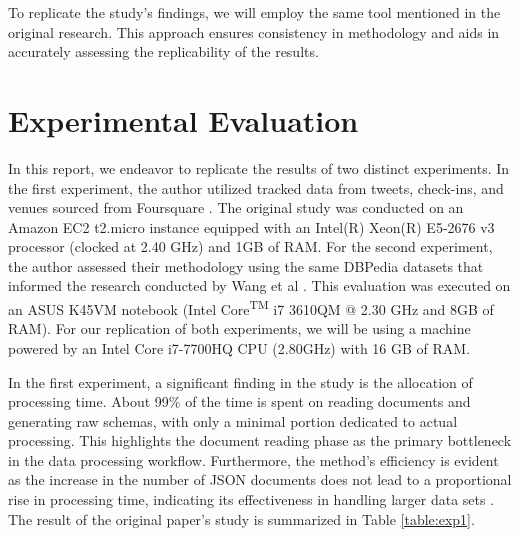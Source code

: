 \documentclass[sigconf, nonacm]{acmart}
\begin{document}
To replicate the study's findings, we will employ the same tool mentioned in the original research. This approach ensures consistency in methodology and aids in accurately assessing the replicability of the results.

\section{Experimental Evaluation} \label{exp-eval}

In this report, we endeavor to replicate the results of two distinct experiments. In the first experiment, the author utilized tracked data from tweets, check-ins, and venues sourced from Foursquare \cite{ccelikten2016modeling}. The original study was conducted on an Amazon EC2 t2.micro instance equipped with an Intel(R) Xeon(R) E5-2676 v3 processor (clocked at 2.40 GHz) and 1GB of RAM. For the second experiment, the author assessed their methodology using the same DBPedia datasets that informed the research conducted by Wang et al \cite{wang2015schema}. This evaluation was executed on an ASUS K45VM notebook (Intel\textsuperscript{\textregistered} Core\textsuperscript{TM} i7 3610QM @ 2.30 GHz and 8GB of RAM). For our replication of both experiments, we will be using a machine powered by an Intel Core i7-7700HQ CPU (2.80GHz) with 16 GB of RAM.

In the first experiment, a significant finding in the study is the allocation of processing time. About 99\% of the time is spent on reading documents and generating raw schemas, with only a minimal portion dedicated to actual processing. This highlights the document reading phase as the primary bottleneck in the data processing workflow. Furthermore, the method's efficiency is evident as the increase in the number of JSON documents does not lead to a proportional rise in processing time, indicating its effectiveness in handling larger data sets \cite{frozza2018approach}. The result of the original paper's study is summarized in Table \ref{table:exp1}.
\end{document}
